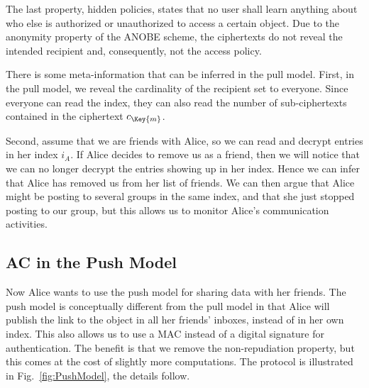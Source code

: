 The last property, hidden policies, states that no user shall learn anything 
about who else is authorized or unauthorized to access a certain object.
Due to the anonymity property of the \ac{ANOBE} scheme, the ciphertexts do not 
reveal the intended recipient and, consequently, not the access policy.

There is some meta-information that can be inferred in the pull model.
First, in the pull model, we reveal the cardinality of the recipient set to 
everyone.
Since everyone can read the index, they can also read the number of 
sub-ciphertexts contained in the ciphertext \(c_{\Key{m}}\).

Second, assume that we are friends with Alice, so we can read and decrypt 
entries in her index \(i_A\).
If Alice decides to remove us as a friend, then we will notice that we can no 
longer decrypt the entries showing up in her index.
Hence we can infer that Alice has removed us from her list of friends.
We can then argue that Alice might be posting to several groups in the same 
index, and that she just stopped posting to our group, but this allows us to 
monitor Alice's communication activities.

\subsection{\acl{AC} in the Push Model}\label{sec:PushModelAC}

Now Alice wants to use the push model for sharing data with her friends.
The push model is conceptually different from the pull model in that Alice will 
publish the link to the object in all her friends' inboxes, instead of in her 
own index.
This also allows us to use a \ac{MAC} instead of a digital signature for 
authentication.
The benefit is that we remove the non-repudiation property, but this comes at 
the cost of slightly more computations.
The protocol is illustrated in Fig.~\ref{fig:PushModel}, the details follow.

